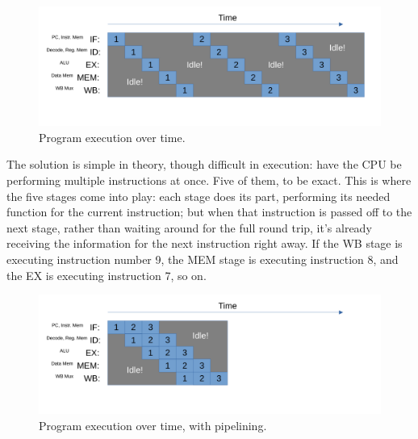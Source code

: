\documentclass[12pt,twoside]{reedthesis}
\begin{document}
\begin{figure}[h!]

	\centering
	\includegraphics[scale=0.6]{wastedsteps}
	\caption{Program execution over time.}
	\label{wasted-steps}
\end{figure}

\break

The solution is simple in theory, though difficult in execution: have the CPU be performing multiple instructions at once. Five of them, to be exact. This is where the five stages come into play: each stage does its part, performing its needed function for the current instruction; but when that instruction is passed off to the next stage, rather than waiting around for the full round trip, it's already receiving the information for the next instruction right away. If the WB stage is executing instruction number 9, the MEM stage is executing instruction 8, and the EX is executing instruction 7, so on.


\begin{figure}[h!]

	\centering
	\includegraphics[scale=0.6]{pipelinedsteps.pdf}
	\caption{Program execution over time, with pipelining.}
	\label{pipelined-steps}
\end{figure}
\end{document}
